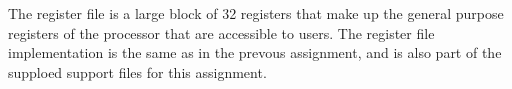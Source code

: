 The register file is a large block of 32 registers that make up the general purpose registers of the processor that are accessible to users.
The register file implementation is the same as in the prevous assignment\cn, and is also part of the supploed support files for this assignment\cn.
